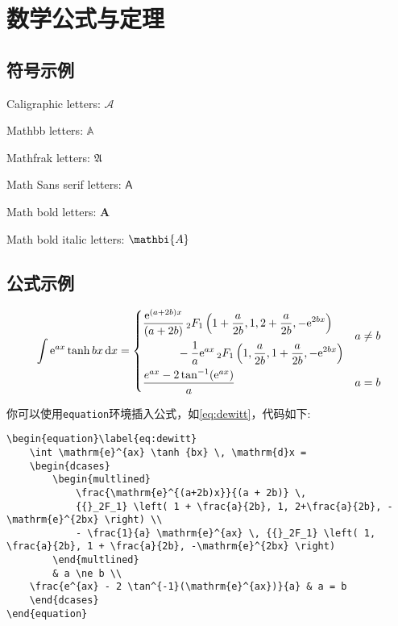 \chapter{数学公式与定理}

\section{符号示例}

Caligraphic letters: $\mathcal{A}$ 

Mathbb letters: $\mathbb{A}$

Mathfrak letters: $\mathfrak{A}$

Math Sans serif letters: $\mathsf{A}$

Math bold letters: $\mathbf{A}$

Math bold italic letters: $\mathbi{A}$

\section{公式示例}
\begin{equation}\label{eq:dewitt}
    \int \mathrm{e}^{ax} \tanh {bx} \, \mathrm{d}x =
    \begin{dcases}
        \begin{multlined}
            \frac{\mathrm{e}^{(a+2b)x}}{(a + 2b)} \,
            {{}_2F_1} \left( 1 + \frac{a}{2b}, 1, 2+\frac{a}{2b}, -\mathrm{e}^{2bx} \right) \\
            - \frac{1}{a} \mathrm{e}^{ax} \, {{}_2F_1} \left( 1, \frac{a}{2b}, 1 + \frac{a}{2b}, -\mathrm{e}^{2bx} \right)
        \end{multlined}
        & a \ne b \\
    \frac{e^{ax} - 2 \tan^{-1}(\mathrm{e}^{ax})}{a} & a = b
  \end{dcases}
\end{equation}

你可以使用\lstinline|equation|环境插入公式，如\cref{eq:dewitt}，代码如下:
\begin{lstlisting}[style=LaTeX]
\begin{equation}\label{eq:dewitt}
    \int \mathrm{e}^{ax} \tanh {bx} \, \mathrm{d}x =
    \begin{dcases}
        \begin{multlined}
            \frac{\mathrm{e}^{(a+2b)x}}{(a + 2b)} \,
            {{}_2F_1} \left( 1 + \frac{a}{2b}, 1, 2+\frac{a}{2b}, -\mathrm{e}^{2bx} \right) \\
            - \frac{1}{a} \mathrm{e}^{ax} \, {{}_2F_1} \left( 1, \frac{a}{2b}, 1 + \frac{a}{2b}, -\mathrm{e}^{2bx} \right)
        \end{multlined}
        & a \ne b \\
    \frac{e^{ax} - 2 \tan^{-1}(\mathrm{e}^{ax})}{a} & a = b
    \end{dcases}
\end{equation}
\end{lstlisting}


